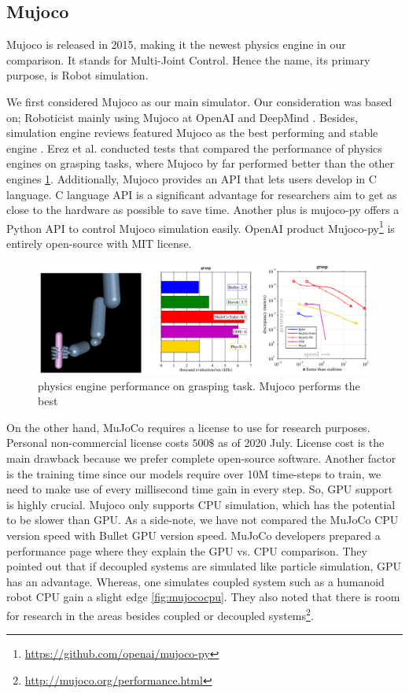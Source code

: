 \subsection{Mujoco}

Mujoco is released in 2015, making it the newest physics engine in our comparison. It stands for Multi-Joint Control. Hence the name, its primary purpose, is Robot simulation.
 
We first considered Mujoco as our main simulator. Our consideration was based on; Roboticist mainly using Mujoco at OpenAI and DeepMind \cite{OpenAIgym}. Besides, simulation engine reviews featured Mujoco as the best performing and stable engine \cite{Erez2015}. Erez et al. conducted tests that compared the performance of physics engines on grasping tasks, where Mujoco by far performed better than the other engines \ref{fig:handmujoco}. Additionally, Mujoco provides an API that lets users develop in C language. C language API is a significant advantage for researchers aim to get as close to the hardware as possible to save time. Another plus is mujoco-py offers a Python API to control Mujoco simulation easily. OpenAI product Mujoco-py\footnote{\url{https://github.com/openai/mujoco-py}} is entirely open-source with MIT license. 

\begin{figure}[htbp]
    \centering
      \includegraphics[width=1.0\textwidth]{figures/MujocoHand}
    \caption{physics engine performance on grasping task. Mujoco performs the best \cite{Erez2015}}
    \label{fig:handmujoco}
\end{figure}


On the other hand, MuJoCo requires a license to use for research purposes. Personal non-commercial license costs \(500\$\) as of 2020 July. License cost is the main drawback because we prefer complete open-source software. Another factor is the training time since our models require over 10M time-steps to train, we need to make use of every millisecond time gain in every step. So, GPU support is highly crucial. Mujoco only supports CPU simulation, which has the potential to be slower than GPU. As a side-note, we have not compared the MuJoCo CPU version speed with Bullet GPU version speed. MuJoCo developers prepared a performance page where they explain the GPU vs. CPU comparison. They pointed out that if decoupled systems are simulated like particle simulation, GPU has an advantage. Whereas, one simulates coupled system such as a humanoid robot CPU gain a slight edge \ref{fig:mujococpu}. They also noted that there is room for research in the areas besides coupled or decoupled systems\footnote{\url{http://mujoco.org/performance.html}}.

